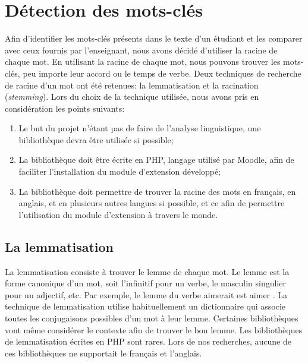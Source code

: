 ﻿\chapter{D\'etection des mots-cl\'es}
\label{chap:keywords}
Afin d'identifier les mots-cl\'es pr\'esents dans le texte d'un \'etudiant et les comparer avec ceux fournis par l'enseignant, nous avons d\'ecid\'e d'utiliser la racine de chaque mot.
En utilisant la racine de chaque mot, nous pouvons trouver les mots-cl\'es, peu importe leur accord ou le temps de verbe.
Deux techniques de recherche de racine d'un mot ont \'et\'e retenues: la lemmatisation et la racination (\textit{stemming}).
Lors du choix de la technique utilis\'ee, nous avons pris en consid\'eration les points suivants:
\begin{enumerate}
  \item Le but du projet n'\'etant pas de faire de l'analyse linguistique, une biblioth\`eque devra \^etre utilis\'ee si possible;
  \item La biblioth\`eque doit \^etre \'ecrite en PHP, langage utilis\'e par Moodle, afin de faciliter l'installation du module d'extension d\'evelopp\'e;
  \item La biblioth\`eque doit permettre de trouver la racine des mots en fran\c{c}ais, en anglais, et en plusieurs autres langues si possible, et ce afin de permettre l'utilisation du module d'extension \`a travers le monde.
\end{enumerate}
\section{La lemmatisation}
La lemmatisation consiste \`a trouver le lemme de chaque mot.
Le lemme est la forme canonique d'un mot, soit l'infinitif pour un verbe, le masculin singulier pour un adjectif, etc.
Par exemple, le lemme du verbe \og aimerait \fg{} est \og aimer \fg{}.
La  technique de lemmatisation utilise habituellement un dictionnaire qui associe toutes les conjugaisons possibles d'un mot \`a leur lemme.
Certaines biblioth\`eques vont m\^eme consid\'erer le contexte afin de trouver le bon lemme.
Les biblioth\`eques de lemmatisation \'ecrites en PHP sont rares.
Lors de nos recherches, aucune de ces biblioth\`eques ne supportait le fran\c{c}ais et l'anglais.

